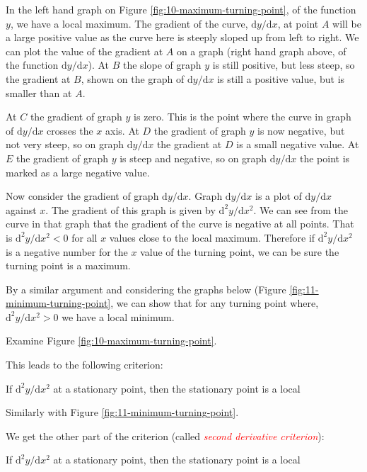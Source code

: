 \documentclass[
  11pt,
  oneside]{book}
\newcommand{\slide}{}
\theoremstyle{definition}
\theoremstyle{definition}
\theoremstyle{definition}
\theoremstyle{definition}
\theoremstyle{remark}
\begin{document}
\begin{notslides}

In the left hand graph on Figure \ref{fig:10-maximum-turning-point}, of the function \(y\), we have a local maximum. The gradient of the curve, \(\mathrm{d}y/\mathrm{d} x\), at point \(A\) will be a large positive value as the curve here is steeply sloped up from left to right. We can plot the value of the gradient at \(A\) on a graph (right hand graph above, of the function \(\mathrm{d}y/\mathrm{d} x\)). At \(B\) the slope of graph \(y\) is still positive, but less steep, so the gradient at \(B\), shown on the graph of \(\mathrm{d}y/\mathrm{d} x\) is still a positive value, but is smaller than at \(A\).

At \(C\) the gradient of graph \(y\) is zero. This is the point where the curve in graph of \(\mathrm{d}y/\mathrm{d} x\) crosses the \(x\) axis. At \(D\) the gradient of graph \(y\) is now negative, but not very steep, so on graph \(\mathrm{d}y/\mathrm{d} x\) the gradient at \(D\) is a small negative value. At \(E\) the gradient of graph \(y\) is steep and negative, so on graph \(\mathrm{d}y/\mathrm{d} x\) the point is marked as a large negative value.

Now consider the gradient of graph \(\mathrm{d}y/\mathrm{d} x\). Graph \(\mathrm{d}y/\mathrm{d} x\) is a plot of \(\mathrm{d}y/\mathrm{d} x\) against \(x\). The gradient of this graph is given by \(\mathrm{d}^{2}y/\mathrm{d} x^2\). We can see from the curve in that graph that the gradient of the curve is negative at all points. That is \(\mathrm{d}^{2}y/\mathrm{d} x^2<0\) for all \(x\) values close to the local maximum. Therefore if \(\mathrm{d}^{2}y/\mathrm{d} x^2\) is a negative number for the \(x\) value of the turning point, we can be sure the turning point is a maximum.
\slide

By a similar argument and considering the graphs below (Figure \ref{fig:11-minimum-turning-point}, we can show that for any turning point where, \(\mathrm{d}^{2}y/\mathrm{d} x^2>0\) we have a local minimum.

\end{notslides}

\begin{slidesonly}

Examine Figure \ref{fig:10-maximum-turning-point}.

\vfill

This leads to the following criterion:

If \(\mathrm{d}^{2}y/\mathrm{d} x^2\) \phantom{aaaaaaa} at a stationary point, then the stationary point is a local

\slide

Similarly with Figure \ref{fig:11-minimum-turning-point}.

\vfill

We get the other part of the criterion (called \textcolor{red}{\em second derivative criterion}):

If \(\mathrm{d}^{2}y/\mathrm{d} x^2\) \phantom{aaaaaaa} at a stationary point, then the stationary point is a local

\end{slidesonly}
\end{document}
